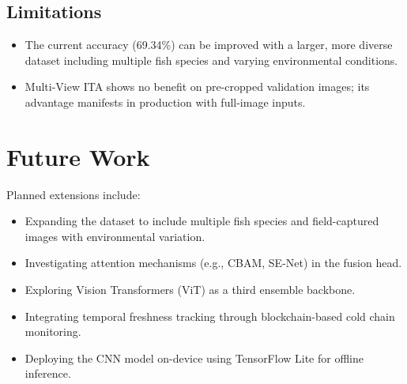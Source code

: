 \documentclass[conference]{IEEEtran}
\begin{document}
\subsection{Limitations}
\begin{itemize}[leftmargin=*]
    \item The current accuracy (69.34\%) can be improved with a larger, more diverse dataset including multiple fish species and varying environmental conditions.
    \item Multi-View ITA shows no benefit on pre-cropped validation images; its advantage manifests in production with full-image inputs.
\end{itemize}

\section{Future Work}

Planned extensions include:
\begin{itemize}[leftmargin=*]
    \item Expanding the dataset to include multiple fish species and field-captured images with environmental variation.
    \item Investigating attention mechanisms (e.g., CBAM, SE-Net) in the fusion head.
    \item Exploring Vision Transformers (ViT) as a third ensemble backbone.
    \item Integrating temporal freshness tracking through blockchain-based cold chain monitoring.
    \item Deploying the CNN model on-device using TensorFlow Lite for offline inference.
\end{itemize}
\end{document}

